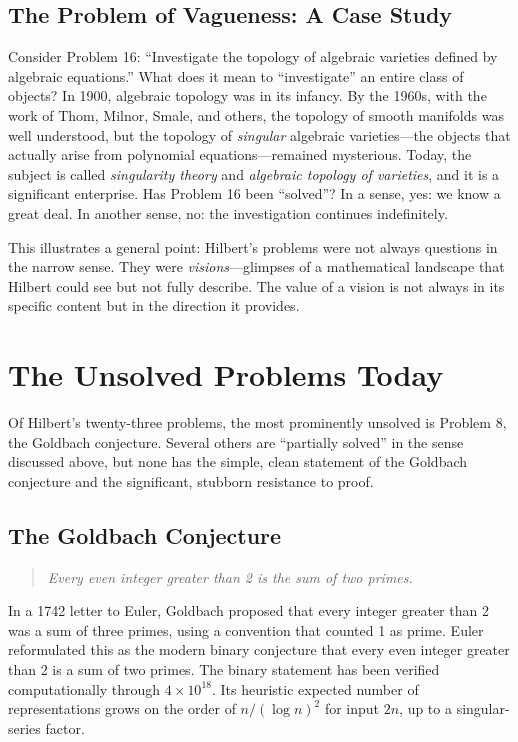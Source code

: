 \subsection{The Problem of Vagueness: A Case Study}

Consider Problem 16: ``Investigate the topology of algebraic varieties defined by algebraic equations.'' What does it mean to ``investigate'' an entire class of objects? In 1900, algebraic topology was in its infancy. By the 1960s, with the work of Thom, Milnor, Smale, and others, the topology of smooth manifolds was well understood, but the topology of \emph{singular} algebraic varieties---the objects that actually arise from polynomial equations---remained mysterious. Today, the subject is called \emph{singularity theory} and \emph{algebraic topology of varieties}, and it is a significant enterprise. Has Problem 16 been ``solved''? In a sense, yes: we know a great deal. In another sense, no: the investigation continues indefinitely.

This illustrates a general point: Hilbert's problems were not always questions in the narrow sense. They were \emph{visions}---glimpses of a mathematical landscape that Hilbert could see but not fully describe. The value of a vision is not always in its specific content but in the direction it provides.

\section{The Unsolved Problems Today}

Of Hilbert's twenty-three problems, the most prominently unsolved is Problem 8, the Goldbach conjecture. Several others are ``partially solved'' in the sense discussed above, but none has the simple, clean statement of the Goldbach conjecture and the significant, stubborn resistance to proof.

\subsection{The Goldbach Conjecture}

\begin{quote}
\textit{Every even integer greater than 2 is the sum of two primes.}
\end{quote}

In a 1742 letter to Euler, Goldbach proposed that every integer greater than 2 was a sum of three primes, using a convention that counted 1 as prime. Euler reformulated this as the modern binary conjecture that every even integer greater than 2 is a sum of two primes. The binary statement has been verified computationally through $4 \times 10^{18}$. Its heuristic expected number of representations grows on the order of $n/(\log n)^2$ for input $2n$, up to a singular-series factor.

